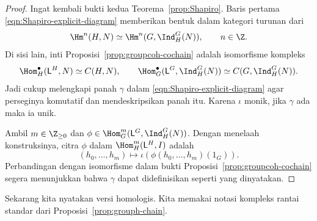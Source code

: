 \begin{proof}
	Ingat kembali bukti kedua Teorema~\ref{prop:Shapiro}. Baris pertama
	\eqref{eqn:Shapiro-explicit-diagram} memberikan bentuk dalam kategori
	turunan dari
	\[ \Hm^n(H,N)\simeq\Hm^n(G,\Ind^G_H(N)),\qquad n\in\Z. \]
	Di sisi lain, inti Proposisi~\ref{prop:groupcoh-cochain} adalah isomorfisme
	kompleks
	\[ \Hom^\bullet_H(\mathsf{L}^H,N)\simeq C(H,N),\qquad
	\Hom^\bullet_G(\mathsf{L}^G,\Ind^G_H(N))
	\simeq C(G,\Ind^G_H(N)). \]
	Jadi cukup melengkapi panah $\gamma$ dalam
	\eqref{eqn:Shapiro-explicit-diagram} agar perseginya komutatif dan
	mendeskripsikan panah itu. Karena $\iota$ monik, jika $\gamma$ ada maka ia
	unik.

	Ambil $m\in\Z_{\geq0}$ dan
	$\phi\in\Hom^m_G(\mathsf{L}^G,\Ind^G_H(N))$. Dengan menelaah konstruksinya,
	citra $\phi$ dalam $\Hom^m_H(\mathsf{L}^H,I)$ adalah
	\[ (h_0,\ldots,h_m)\mapsto
	\iota\left(\phi(h_0,\ldots,h_m)(1_G)\right). \]
	Perbandingan dengan isomorfisme dalam bukti
	Proposisi~\ref{prop:groupcoh-cochain} segera menunjukkan bahwa $\gamma$
	dapat didefinisikan seperti yang dinyatakan.
\end{proof}

Sekarang kita nyatakan versi homologis. Kita memakai notasi kompleks rantai
standar dari Proposisi~\ref{prop:grouph-chain}.


